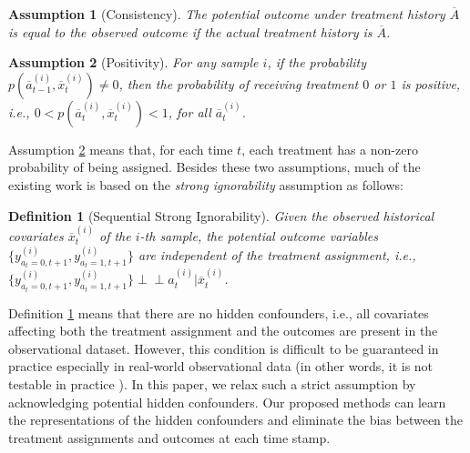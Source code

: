 \documentclass[journal]{IEEEtran}
\newtheorem{definition}{Definition}
\newtheorem{assumption}{Assumption}[section]
\newcommand{\indep}{\perp\!\!\!\!\perp}
\begin{document}
\begin{assumption}[Consistency]\label{as:consistency}
The potential outcome under treatment history $\overline{A}$ is equal to the observed outcome if the actual treatment history is $\overline{A}$.
\end{assumption}

\begin{assumption}[Positivity]\label{as:positivity}
For any sample $i$, if the probability  $p(\overline{a}^{(i)}_{t-1},\overline{x}^{(i)}_{t})\neq0$, then the probability of receiving treatment $0$ or $1$ is positive, i.e., %
$0<p(\overline{a}^{(i)}_{t},\overline{x}^{(i)}_{t} )<1$, for all $\overline{a}^{(i)}_{t}$. %
\end{assumption}
Assumption \ref{as:positivity} means that, for each time $t$, each treatment has a non-zero probability of being assigned. 
Besides these two assumptions, much of the existing work is based on the \textit{strong ignorability} assumption as follows:

\begin{definition}[Sequential Strong Ignorability]\label{as:ignorability}
Given the observed historical covariates $\overline{x}^{(i)}_t$ %
of the $i$-th sample, the potential outcome variables $\{y^{(i)}_{a_t=0,t+1}, y^{(i)}_{a_t=1,t+1}\}$ are independent of the treatment assignment, i.e., $\{y^{(i)}_{a_t=0,t+1}, y^{(i)}_{a_t=1,t+1}\}\indep  a^{(i)}_{t}|\overline{x}^{(i)}_t$. %
\end{definition}

Definition \ref{as:ignorability} means that there are no hidden confounders, i.e., all covariates affecting both the treatment assignment and the outcomes are present in the observational dataset. 
However, this condition is difficult to be guaranteed in practice especially in real-world observational data (in other words, it is not testable in practice \cite{robins2000marginal,  pearl2009causality}).
In this paper, we relax such a strict assumption by acknowledging potential hidden confounders. Our proposed methods can learn the representations of the hidden confounders and eliminate the bias between the treatment assignments and outcomes at each time stamp.
\end{document}
